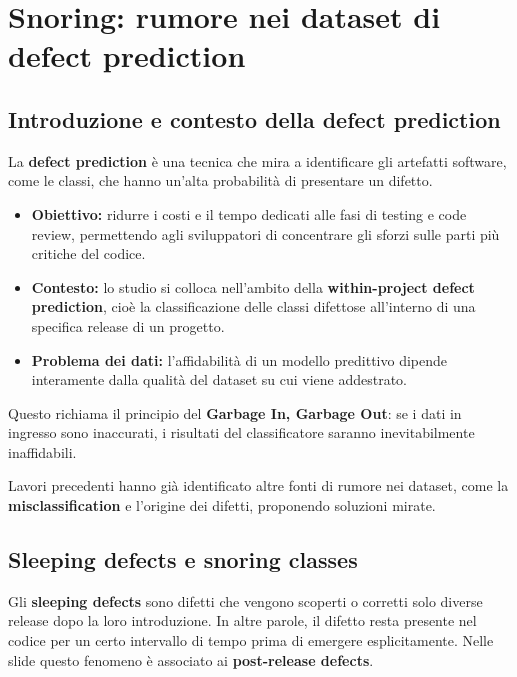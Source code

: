 \chapter{Snoring: rumore nei dataset di defect prediction}

\section{Introduzione e contesto della defect prediction}

La \textbf{defect prediction} è una tecnica che mira a identificare gli artefatti software, come le classi, che hanno un'alta probabilità di presentare un difetto.

\begin{itemize}
    \item \textbf{Obiettivo:} ridurre i costi e il tempo dedicati alle fasi di testing e code review, permettendo agli sviluppatori di concentrare gli sforzi sulle parti più critiche del codice.
    \item \textbf{Contesto:} lo studio si colloca nell'ambito della \textbf{within-project defect prediction}, cioè la classificazione delle classi difettose all'interno di una specifica release di un progetto.
    \item \textbf{Problema dei dati:} l'affidabilità di un modello predittivo dipende interamente dalla qualità del dataset su cui viene addestrato.
\end{itemize}

\begin{notaprof}
Questo richiama il principio del \textbf{Garbage In, Garbage Out}: se i dati in ingresso sono inaccurati, i risultati del classificatore saranno inevitabilmente inaffidabili.
\end{notaprof}

\begin{notaslide}
Lavori precedenti hanno già identificato altre fonti di rumore nei dataset, come la \textbf{misclassification} e l'origine dei difetti, proponendo soluzioni mirate.
\end{notaslide}

\section{Sleeping defects e snoring classes}

Gli \textbf{sleeping defects} sono difetti che vengono scoperti o corretti solo diverse release dopo la loro introduzione. In altre parole, il difetto resta presente nel codice per un certo intervallo di tempo prima di emergere esplicitamente. Nelle slide questo fenomeno è associato ai \textbf{post-release defects}.

